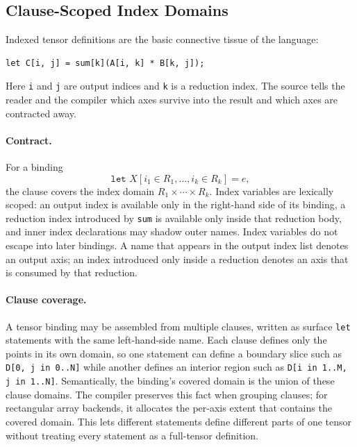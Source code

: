 \documentclass[sigplan,screen,nonacm]{acmart}
\begin{document}
\subsection{Clause-Scoped Index Domains}

Indexed tensor definitions are the basic connective tissue of the language:

\begin{lstlisting}[style=einlang]
let C[i, j] = sum[k](A[i, k] * B[k, j]);
\end{lstlisting}

Here \texttt{i} and \texttt{j} are output indices and \texttt{k} is a reduction index. The source tells the reader and the compiler which axes survive into the result and which axes are contracted away.

\paragraph{Contract.}
For a binding
\[
\texttt{let } X[i_1 \in R_1,\ldots,i_k \in R_k] = e,
\]
the clause covers the index domain $R_1 \times \cdots \times R_k$. Index variables are lexically scoped: an output index is available only in the right-hand side of its binding, a reduction index introduced by \texttt{sum} is available only inside that reduction body, and inner index declarations may shadow outer names. Index variables do not escape into later bindings. A name that appears in the output index list denotes an output axis; an index introduced only inside a reduction denotes an axis that is consumed by that reduction.

\paragraph{Clause coverage.}
A tensor binding may be assembled from multiple clauses, written as surface \texttt{let} statements with the same left-hand-side name. Each clause defines only the points in its own domain, so one statement can define a boundary slice such as \texttt{D[0, j in 0..N]} while another defines an interior region such as \texttt{D[i in 1..M, j in 1..N]}. Semantically, the binding's covered domain is the union of these clause domains. The compiler preserves this fact when grouping clauses; for rectangular array backends, it allocates the per-axis extent that contains the covered domain. This lets different statements define different parts of one tensor without treating every statement as a full-tensor definition.
\end{document}
